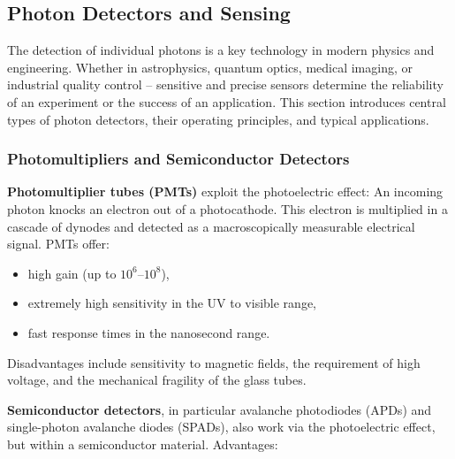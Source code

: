 \subsection{Photon Detectors and Sensing}

The detection of individual photons is a key technology in modern physics and engineering. Whether in astrophysics, quantum optics, medical imaging, or industrial quality control – sensitive and precise sensors determine the reliability of an experiment or the success of an application. This section introduces central types of photon detectors, their operating principles, and typical applications.

\subsubsection{Photomultipliers and Semiconductor Detectors}

\textbf{Photomultiplier tubes (PMTs)} exploit the photoelectric effect: An incoming photon knocks an electron out of a photocathode. This electron is multiplied in a cascade of dynodes and detected as a macroscopically measurable electrical signal. PMTs offer:

\begin{itemize}
	\item high gain (up to $10^6$–$10^8$),
	\item extremely high sensitivity in the UV to visible range,
	\item fast response times in the nanosecond range.
\end{itemize}

Disadvantages include sensitivity to magnetic fields, the requirement of high voltage, and the mechanical fragility of the glass tubes.

\medskip

\textbf{Semiconductor detectors}, in particular avalanche photodiodes (APDs) and single-photon avalanche diodes (SPADs), also work via the photoelectric effect, but within a semiconductor material. Advantages:

